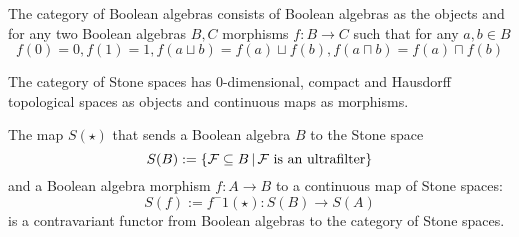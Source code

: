 \begin{dfn}
    The category of Boolean algebras consists of Boolean algebras as the objects
    and for any two Boolean algebras $B, C$ morphisms $f:B \to C$ such that
    for any $a,b \in B$
    \[f(0) = 0, f(1) = 1, f(a \sqcup b) = f(a) \sqcup f(b), 
    f(a \sqcap b) = f(a) \sqcap f(b)\] 
\end{dfn}

\begin{dfn}
    The category of Stone spaces has
    $0$-dimensional, 
    compact and Hausdorff topological spaces as objects and 
    continuous maps as morphisms.
\end{dfn}

\begin{prop}
    The map
    $S(\star)$ that sends a Boolean algebra $B$ to the Stone space
    \[S(B) := \left\{\mathcal{F} \subseteq B \,|\, \mathcal{F} \text{ is an ultrafilter}\right\}\]
    and a Boolean algebra morphism
    $f: A \to B$ to a continuous map of Stone spaces:
    \[S(f) := f^-1(\star) : S(B) \to S(A)\]
    is a contravariant functor from Boolean algebras to the category of Stone
    spaces.
\end{prop}
